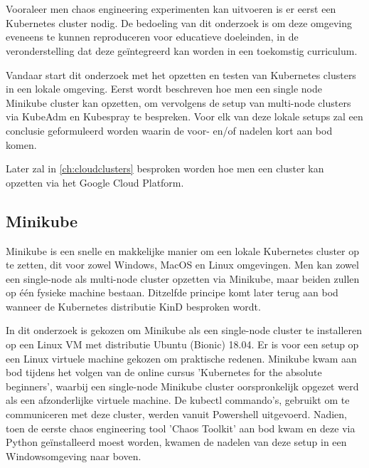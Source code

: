 
\chapter{}
\label{ch:lokaleclusters}

Vooraleer men chaos engineering experimenten kan uitvoeren is er eerst een Kubernetes cluster nodig. De bedoeling van dit onderzoek is om deze omgeving eveneens te kunnen reproduceren voor educatieve doeleinden, in de veronderstelling dat deze geïntegreerd kan worden in een toekomstig curriculum.

Vandaar start dit onderzoek met het opzetten en testen van Kubernetes clusters in een lokale omgeving. Eerst wordt beschreven hoe men een single node Minikube cluster kan opzetten, om vervolgens de setup van multi-node clusters via KubeAdm en Kubespray te bespreken. Voor elk van deze lokale setups zal een conclusie geformuleerd worden waarin de voor- en/of nadelen kort aan bod komen.  

Later zal in \ref{ch:cloudclusters} besproken worden hoe men een cluster kan opzetten via het Google Cloud Platform. 

\section{Minikube}

Minikube is een snelle en makkelijke manier om een lokale Kubernetes cluster op te zetten, dit voor zowel Windows, MacOS en Linux omgevingen.  \autocite{Minikube2022} Men kan zowel een single-node als multi-node cluster opzetten via Minikube, maar beiden zullen op één fysieke machine bestaan. Ditzelfde principe komt later terug aan bod wanneer de Kubernetes distributie KinD besproken wordt. 

In dit onderzoek is gekozen om Minikube als een single-node cluster te installeren op een Linux VM met distributie Ubuntu (Bionic) 18.04. Er is voor een setup op een Linux virtuele machine gekozen om praktische redenen. Minikube kwam aan bod tijdens het volgen van de online cursus 'Kubernetes for the absolute beginners', waarbij een single-node Minikube cluster oorspronkelijk opgezet werd als een afzonderlijke virtuele machine. De kubectl commando's, gebruikt om te communiceren met deze cluster, werden vanuit Powershell uitgevoerd. Nadien, toen de eerste chaos engineering tool 'Chaos Toolkit' aan bod kwam en deze via Python geïnstalleerd moest worden, kwamen de nadelen van deze setup in een Windowsomgeving naar boven.

